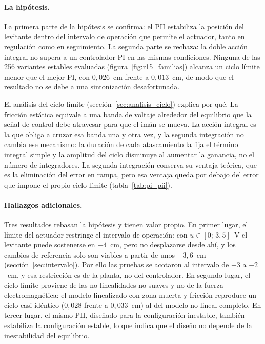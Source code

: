 \paragraph{La hipótesis.}
La primera parte de la hipótesis se confirma: el PII estabiliza la posición del levitante dentro del intervalo de operación que permite el actuador, tanto en regulación como en seguimiento. La segunda parte se rechaza: la doble acción integral no supera a un controlador PI en las mismas condiciones. Ninguna de las 256 variantes estables evaluadas (figura~\ref{fig:r15_familias}) alcanza un ciclo límite menor que el mejor PI, con $0{,}026$~cm frente a $0{,}013$~cm, de modo que el resultado no se debe a una sintonización desafortunada.

El análisis del ciclo límite (sección~\ref{sec:analisis_ciclo}) explica por qué. La fricción estática equivale a una banda de voltaje alrededor del equilibrio que la señal de control debe atravesar para que el imán se mueva. La acción integral es la que obliga a cruzar esa banda una y otra vez, y la segunda integración no cambia ese mecanismo: la duración de cada atascamiento la fija el término integral simple y la amplitud del ciclo disminuye al aumentar la ganancia, no el número de integradores. La segunda integración conserva su ventaja teórica, que es la eliminación del error en rampa, pero esa ventaja queda por debajo del error que impone el propio ciclo límite (tabla~\ref{tab:pi_pii}).

\paragraph{Hallazgos adicionales.}
Tres resultados rebasan la hipótesis y tienen valor propio. En primer lugar, el límite del actuador restringe el intervalo de operación: con $u\in[0;\,3{,}5]$~V el levitante puede sostenerse en $-4$~cm, pero no desplazarse desde ahí, y los cambios de referencia solo son viables a partir de unos $-3{,}6$~cm (sección~\ref{sec:intervalo}). Por ello las pruebas se acotaron al intervalo de $-3$ a $-2$~cm, y esa restricción es de la planta, no del controlador. En segundo lugar, el ciclo límite proviene de las no linealidades no suaves y no de la fuerza electromagnética: el modelo linealizado con zona muerta y fricción reproduce un ciclo casi idéntico ($0{,}028$ frente a $0{,}033$~cm) al del modelo no lineal completo. En tercer lugar, el mismo PII, diseñado para la configuración inestable, también estabiliza la configuración estable, lo que indica que el diseño no depende de la inestabilidad del equilibrio.

